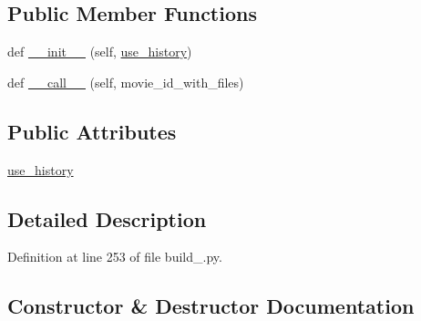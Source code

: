 \subsection*{Public Member Functions}
\begin{DoxyCompactItemize}
\item 
def \hyperlink{classparlai_1_1tasks_1_1opensubtitles_1_1build__2018_1_1DataProcessor_a612e852d0953d2cfffc7647c05ed3f07}{\+\_\+\+\_\+init\+\_\+\+\_\+} (self, \hyperlink{classparlai_1_1tasks_1_1opensubtitles_1_1build__2018_1_1DataProcessor_a52bc17feae8ce3b6f603cc6f1c5c9cdc}{use\+\_\+history})
\item 
def \hyperlink{classparlai_1_1tasks_1_1opensubtitles_1_1build__2018_1_1DataProcessor_a64433b1be4945c3e7b781be536dede58}{\+\_\+\+\_\+call\+\_\+\+\_\+} (self, movie\+\_\+id\+\_\+with\+\_\+files)
\end{DoxyCompactItemize}
\subsection*{Public Attributes}
\begin{DoxyCompactItemize}
\item 
\hyperlink{classparlai_1_1tasks_1_1opensubtitles_1_1build__2018_1_1DataProcessor_a52bc17feae8ce3b6f603cc6f1c5c9cdc}{use\+\_\+history}
\end{DoxyCompactItemize}


\subsection{Detailed Description}


Definition at line 253 of file build\+\_.\+py.



\subsection{Constructor \& Destructor Documentation}
\mbox{\label{classparlai_1_1tasks_1_1opensubtitles_1_1build__2018_1_1DataProcessor_a612e852d0953d2cfffc7647c05ed3f07}} 
